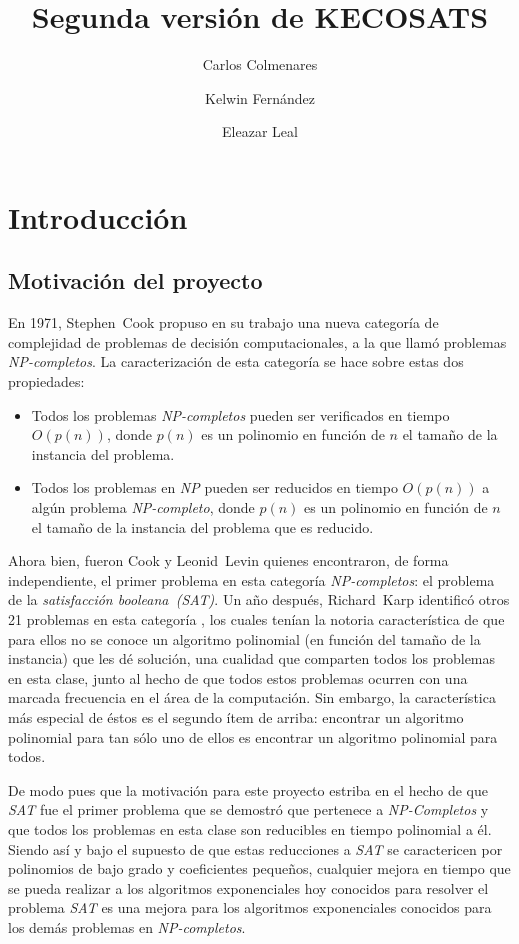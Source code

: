 \documentclass[12pt,lettersize,oneside]{article}
\title{Segunda versión de KECOSATS}
\author{Carlos Colmenares \and Kelwin Fernández \and Eleazar Leal}
\begin{document}
\maketitle
\setlength{\parskip}{2.5mm}
\setlength{\itemsep}{0ex }
\section{Introducción}

\subsection{Motivación del proyecto}
En 1971, Stephen~Cook propuso en su trabajo\cite{Cook} una nueva categoría de
complejidad de problemas de decisión computacionales, a la que llamó problemas
\emph{NP-completos}. La caracterización de esta categoría se hace sobre estas
dos propiedades:
\begin{itemize}
  \item Todos los problemas \emph{NP-completos} pueden ser verificados en tiempo
    $O(p(n))$, donde $p(n)$ es un polinomio en función de $n$ el tamaño de la
    instancia del problema. 
  \item Todos los problemas en \emph{NP} pueden ser reducidos en tiempo
    $O(p(n))$ a algún problema \emph{NP-completo}, donde $p(n)$ es un polinomio
    en función de $n$ el tamaño de la instancia del problema que es reducido.
\end{itemize}

Ahora bien, fueron Cook y Leonid~Levin quienes encontraron, de forma
independiente, el primer problema en esta categoría \emph{NP-completos}: el
problema de la \emph{satisfacción booleana~(SAT)}. Un año después, Richard~Karp
identificó otros 21 problemas en esta categoría \cite{Karp}, los cuales tenían
la notoria característica de que para ellos no se conoce un algoritmo polinomial
(en función del tamaño de la instancia) que les dé solución, una cualidad que
comparten todos los problemas en esta clase, junto al hecho de que todos estos
problemas ocurren con una marcada frecuencia en el área de la computación. Sin
embargo, la característica más especial de éstos es el segundo ítem de arriba:
encontrar un algoritmo polinomial para tan sólo uno de ellos es encontrar un
algoritmo polinomial para todos.

De modo pues que la motivación para este proyecto estriba en el hecho de que
\emph{SAT} fue el primer problema que se demostró que pertenece a
\emph{NP-Completos} y que todos los problemas en esta clase son reducibles en
tiempo polinomial a él. Siendo así y bajo el supuesto de que estas reducciones a
\emph{SAT} se caractericen por polinomios de bajo grado y coeficientes pequeños,
cualquier mejora en tiempo que se pueda realizar a los algoritmos exponenciales
hoy conocidos para resolver el problema \emph{SAT} es una mejora para los
algoritmos exponenciales conocidos para los demás problemas en
\emph{NP-completos}.
\end{document}
